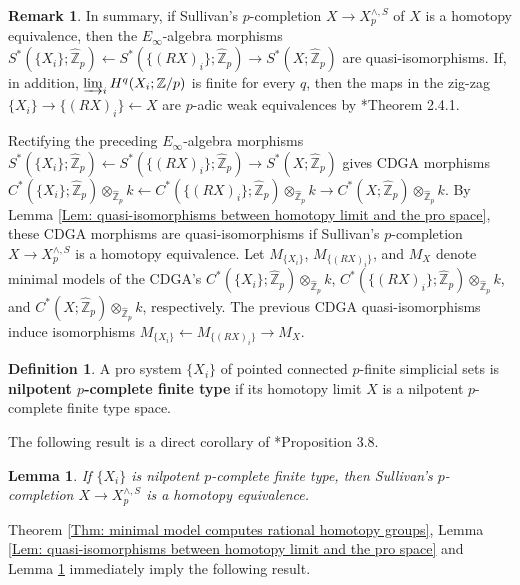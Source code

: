 \documentclass[11pt]{amsart}
\newtheorem{lemma}[theorem]{Lemma}
\theoremstyle{definition}
\newtheorem{definition}[theorem]{Definition}
\newtheorem{remark}[theorem]{Remark}
\numberwithin{equation}{section}
\numberwithin{equation}{section}
\newcommand\ZZ{\mathbb{Z}}
\begin{document}
\begin{remark}
In summary, if Sullivan's $p$-completion $X\rightarrow X^{\wedge,S}_p$ of $X$ is a homotopy equivalence, then the $E_{\infty}$-algebra morphisms $S^*(\{X_i\};\widehat{\ZZ}_p)\leftarrow S^*(\{(RX)_i\};\widehat{\ZZ}_p)\rightarrow S^*(X;\widehat{\ZZ}_p)$ are quasi-isomorphisms. If, in addition, $\varinjlim_i H^q(X_i;\ZZ/p)$ is finite for every $q$, then the maps in the zig-zag $\{X_i\}\rightarrow \{(RX)_i\}\leftarrow X$ are $p$-adic weak equivalences by \cite{Morel-p-adic-spaces}*{Theorem 2.4.1}.
\end{remark}

Rectifying the preceding $E_{\infty}$-algebra morphisms $S^*(\{X_i\};\widehat{\ZZ}_p)\leftarrow S^*(\{(RX)_i\};\widehat{\ZZ}_p)\rightarrow S^*(X;\widehat{\ZZ}_p)$ gives CDGA morphisms $C^*(\{X_i\};\widehat{\ZZ}_p)\otimes_{\widehat{\ZZ}_p} k\leftarrow C^*(\{(RX)_i\};\widehat{\ZZ}_p)\otimes_{\widehat{\ZZ}_p} k\rightarrow C^*(X;\widehat{\ZZ}_p)\otimes_{\widehat{\ZZ}_p} k$. By Lemma \ref{Lem: quasi-isomorphisms between homotopy limit and the pro space}, these CDGA morphisms are quasi-isomorphisms if Sullivan's $p$-completion $X\rightarrow X^{\wedge,S}_p$ is a homotopy equivalence. Let $M_{\{X_i\}}$, $M_{\{(RX)_i\}}$, and $M_X$ denote minimal models of the CDGA's $C^*(\{X_i\};\widehat{\ZZ}_p)\otimes_{\widehat{\ZZ}_p} k$, $ C^*(\{(RX)_i\};\widehat{\ZZ}_p)\otimes_{\widehat{\ZZ}_p} k$, and $ C^*(X;\widehat{\ZZ}_p)\otimes_{\widehat{\ZZ}_p} k$, respectively. The previous CDGA quasi-isomorphisms induce isomorphisms $M_{\{X_i\}}\leftarrow M_{\{(RX)_i\}}\rightarrow M_X$.

\begin{definition}
A pro system $\{X_i\}$ of pointed connected $p$-finite simplicial sets is \textbf{nilpotent $p$-complete finite type} if its homotopy limit $X$ is a nilpotent $p$-complete finite type space.
\end{definition}

The following result is a direct corollary of \cite{Sullivan-1970-unpublished-notes}*{Proposition 3.8}.

\begin{lemma}\label{Lem: nilpotent $p$-complete finite types are good}
If $\{X_i\}$ is nilpotent $p$-complete finite type, then Sullivan's $p$-completion $X\rightarrow X^{\wedge,S}_p$ is a homotopy equivalence.
\end{lemma}

Theorem \ref{Thm: minimal model computes rational homotopy groups}, Lemma \ref{Lem: quasi-isomorphisms between homotopy limit and the pro space} and Lemma \ref{Lem: nilpotent $p$-complete finite types are good} immediately imply the following result.
\end{document}
